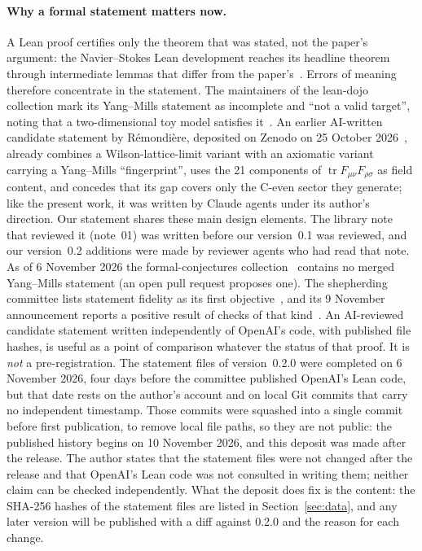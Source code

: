 \documentclass[11pt]{article}
\theoremstyle{definition}
\theoremstyle{remark}
\newcommand{\tr}{\operatorname{tr}}
\begin{document}
\paragraph{Why a formal statement matters now.}
A Lean proof certifies only the theorem that was stated, not the paper's argument: the
Navier--Stokes Lean development reaches its headline theorem through intermediate lemmas that differ
from the paper's~\cite{Bastounis2026}. Errors of meaning therefore concentrate in the statement. The
maintainers of the lean-dojo collection mark its Yang--Mills statement as incomplete and ``not a valid
target'', noting that a two-dimensional toy model satisfies it~\cite{Leandojo2026}. An earlier
AI-written candidate statement by R\'emondi\`ere, deposited on Zenodo on 25 October
2026~\cite{Remondiere2026}, already combines a Wilson-lattice-limit variant with an axiomatic variant
carrying a Yang--Mills ``fingerprint'', uses the 21 components of $\tr F_{\mu\nu}F_{\rho\sigma}$ as
field content, and concedes that its gap covers only the C-even sector they generate; like the present
work, it was written by Claude agents under its author's direction. Our statement shares these main
design elements. The library note that reviewed it (note~01) was written before our version~0.1 was
reviewed, and our version~0.2 additions were made by reviewer agents who had read that note. As of
6 November 2026 the formal-conjectures collection~\cite{DeepMind2026} contains no merged Yang--Mills
statement (an open pull request proposes one). The shepherding committee lists statement fidelity as
its first objective~\cite{Douglas2026e}, and its 9 November announcement reports a positive result of
checks of that kind~\cite{Douglas2026g}. An AI-reviewed candidate statement written independently of
OpenAI's code, with published file hashes, is useful as a point of comparison whatever the status of
that proof. It is \emph{not} a pre-registration. The statement files of version~0.2.0 were completed
on 6 November 2026, four days before the committee published OpenAI's Lean code, but that date rests
on the author's account and on local Git commits that carry no independent timestamp. Those commits
were squashed into a single commit before first publication, to remove local file paths, so they are
not public: the published history begins on 10 November 2026, and this deposit was made after the
release. The author states that the statement files were not changed after the release and that
OpenAI's Lean code was not consulted in writing them; neither claim can be checked independently. What the deposit does fix is the content: the
SHA-256 hashes of the statement files are listed in Section~\ref{sec:data}, and any later version will
be published with a diff against 0.2.0 and the reason for each change.
\end{document}
